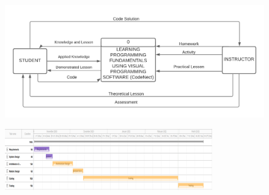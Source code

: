 \begin{doublespace}
\begin{center}
		\begin{figure}[H]
			\centering
			\includegraphics[width=\textwidth]{figures/context_diagram.png}
			\caption{}
			\label{fig:context_diagram}
		\end{figure}
		\vfill


		\begin{figure}
			\centering
			\includegraphics[width=0.8\textwidth]{figures/gantt_chart.png}
			\caption{}
			\label{fig:gantt_chart}
		\end{figure}
		\vfill


\end{center}
\end{doublespace}
